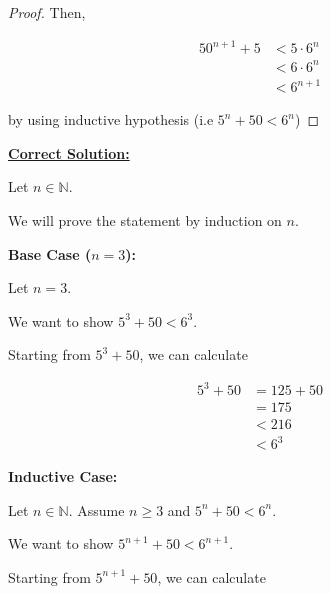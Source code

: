 \documentclass[12pt]{article}
\begin{document}
\begin{itemize}
\begin{proof}
    \bigskip

    Then,

    \begin{align}
        50^{n+1} + 5 &< 5 \cdot 6^n\\
        &< 6 \cdot 6^n\\
        &< 6^{n+1}
    \end{align}

    by using inductive hypothesis (i.e $5^n + 50 < 6^n$)

    \end{proof}

    \bigskip

    \begin{mdframed}
        \underline{\textbf{Correct Solution:}}

        \bigskip

        Let $n \in \mathbb{N}$.

        \bigskip

        We will prove the statement by induction on $n$.

        \bigskip

        \textbf{Base Case ($n = 3$):}

        \bigskip

        Let $n = 3$.

        \bigskip

        We want to show $5^3 + 50 < 6^3$.

        \bigskip

        Starting from $5^3 + 50$, we can calculate

        \setcounter{equation}{0}
        \begin{align}
            5^3 + 50 &= 125 + 50\\
            &= 175\\
            &< 216\\
            &< 6^3
        \end{align}

        \bigskip

        \textbf{Inductive Case:}

        \bigskip

        Let $n \in \mathbb{N}$. Assume $n \geq 3$ and $5^n + 50 < 6^n$.

        \bigskip

        We want to show $5^{n+1} + 50 < 6^{n+1}$.

        \bigskip

        Starting from $5^{n+1} + 50$, we can calculate


\end{mdframed}
\end{itemize}
\end{document}
